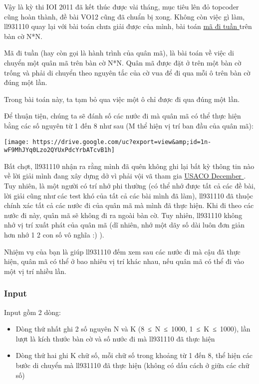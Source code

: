 

Vậy là kỳ thi IOI 2011 đã kết thúc được vài tháng, mục tiêu lên đỏ topcoder cũng hoàn thành, đề bài VO12 cũng đã chuẩn bị xong. Không còn việc gì làm, ll931110 quay lại với bài toán chưa giải được của mình, bài toán \href{http://en.wikipedia.org/wiki/Knights_tour}{ mã đi tuần } trên bàn cờ N*N.

Mã đi tuần (hay còn gọi là hành trình của quân mã), là bài toán về việc di chuyển một quân mã trên bàn cờ N*N. Quân mã được đặt ở trên một bàn cờ trống và phải di chuyển theo nguyên tắc của cờ vua để đi qua mỗi ô trên bàn cờ đúng một lần.

Trong bài toán này, ta tạm bỏ qua việc một ô chỉ được đi qua đúng một lần.

Để thuận tiện, chúng ta sẽ đánh số các nước đi mà quân mã có thể thực hiện bằng các số nguyên từ 1 đến 8 như sau (M thể hiện vị trí ban đầu của quân mã):


\texttt{[image: https://drive.google.com/uc?export=view\&amp;id=1n-wF9MhJYq0Lzo2QYUxPdcYrbATcvB1h]}

Bất chợt, ll931110 nhận ra rằng mình đã quên không ghi lại bất kỳ thông tin nào về lời giải mình đang xây dựng dở vì phải vội vã tham gia \href{http://www.usaco.org/current/data/dec11_gold_results.html}{ USACO December } . Tuy nhiên, là một người có trí nhớ phi thường (có thể nhớ được tất cả các đề bài, lời giải cũng như các test khó của tất cả các bài mình đã làm), ll931110 đã thuộc chính xác tất cả các nước đi của quân mã mà mình đã thực hiện. Khi đi theo các nước đi này, quân mã sẽ không đi ra ngoài bàn cờ. Tuy nhiên, ll931110 không nhớ vị trí xuất phát của quân mã (dĩ nhiên, nhớ một dãy số dài luôn đơn giản hơn nhớ 1 2 con số vô nghĩa :) ).

Nhiệm vụ của bạn là giúp ll931110 đếm xem sau các nước đi mà cậu đã thực hiện, quân mã có thể ở bao nhiêu vị trí khác nhau, nếu quân mã có thể đi vào một vị trí nhiều lần.

\subsubsection{Input}

Input gồm 2 dòng:
\begin{itemize}
	\item Dòng thứ nhất ghi 2 số nguyên N và K (8 ≤ N ≤ 1000, 1 ≤ K ≤ 1000), lần lượt là kích thước bàn cờ và số nước đi mà ll931110 đã thực hiện
	\item Dòng thứ hai ghi K chữ số, mỗi chữ số trong khoảng từ 1 đến 8, thể hiện các bước di chuyển mà ll931110 đã thực hiện (không có dấu cách ở giữa các chữ số)
\end{itemize}

